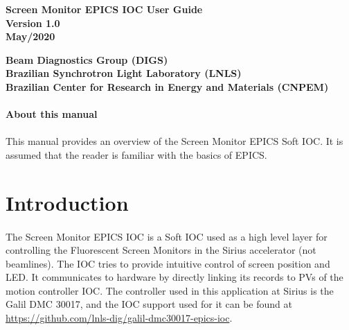 \documentclass[openany]{article}
\begin{document}
\begin{titlepage}

\thispagestyle{fancy}

\begin{center}

\vspace*{\fill}
\textbf{\Huge Screen Monitor EPICS IOC User Guide}\\[20pt]
\textbf{\Huge Version 1.0}\\[20pt]
\textbf{\Huge May/2020}
\vspace*{\fill}

\vfill
\textbf{Beam Diagnostics Group (DIGS)}\\[5pt]
\textbf{Brazilian Synchrotron Light Laboratory (LNLS)}\\[5pt]
\textbf{Brazilian Center for Research in Energy and Materials (CNPEM)}
\end{center}

\end{titlepage}

\newpage
\pagestyle{plain} %

\paragraph{}{\Large\bfseries About this manual}

\paragraph{} This manual provides an overview of the Screen Monitor EPICS Soft IOC. It is assumed that the reader is familiar with the basics of EPICS.

\tableofcontents

\newpage
\section{Introduction}

\paragraph{} The Screen Monitor EPICS IOC is a Soft IOC used as a high level layer for controlling the Fluorescent Screen Monitors in the Sirius accelerator (not beamlines). The IOC tries to provide intuitive control of screen position and LED. It communicates to hardware by directly linking its records to PVs of the motion controller IOC. The controller used in this application at Sirius is the Galil DMC 30017, and the IOC support used for it can be found at \url{https://github.com/lnls-dig/galil-dmc30017-epics-ioc}.
\end{document}
